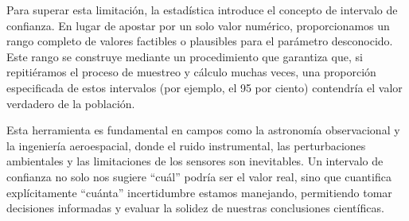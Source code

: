 Para superar esta limitación, la estadística introduce el concepto de intervalo de confianza. En lugar de apostar por un solo valor numérico, proporcionamos un rango completo de valores factibles o plausibles para el parámetro desconocido. Este rango se construye mediante un procedimiento que garantiza que, si repitiéramos el proceso de muestreo y cálculo muchas veces, una proporción especificada de estos intervalos (por ejemplo, el 95 por ciento) contendría el valor verdadero de la población. 

Esta herramienta es fundamental en campos como la astronomía observacional y la ingeniería aeroespacial, donde el ruido instrumental, las perturbaciones ambientales y las limitaciones de los sensores son inevitables. Un intervalo de confianza no solo nos sugiere ``cuál'' podría ser el valor real, sino que cuantifica explícitamente ``cuánta'' incertidumbre estamos manejando, permitiendo tomar decisiones informadas y evaluar la solidez de nuestras conclusiones científicas.
